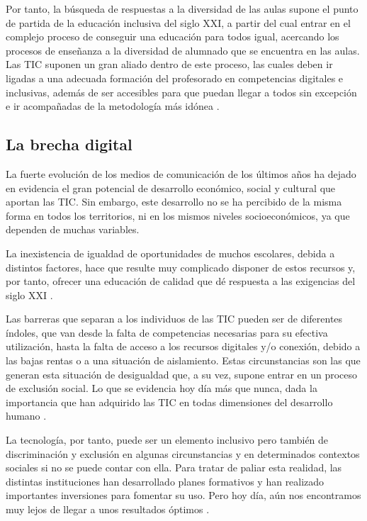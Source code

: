 \documentclass{textolivre}
\begin{document}
Por tanto, la búsqueda de respuestas a la diversidad de las aulas supone el punto de partida de la educación inclusiva del siglo XXI, a partir del cual entrar en el complejo proceso de conseguir una educación para todos igual, acercando los procesos de enseñanza a la diversidad de alumnado que se encuentra en las aulas. Las TIC suponen un gran aliado dentro de este proceso, las cuales deben ir ligadas a una adecuada formación del profesorado en competencias digitales e inclusivas, además de ser accesibles para que puedan llegar a todos sin excepción e ir acompañadas de la metodología más idónea \cite{marindiaz2020}.

\subsection{La brecha digital}
La fuerte evolución de los medios de comunicación de los últimos años ha dejado en evidencia el gran potencial de desarrollo económico, social y cultural que aportan las TIC. Sin embargo, este desarrollo no se ha percibido de la misma forma en todos los territorios, ni en los mismos niveles socioeconómicos, ya que dependen de muchas variables.

La inexistencia de igualdad de oportunidades de muchos escolares, debida a distintos factores, hace que resulte muy complicado disponer de estos recursos y, por tanto, ofrecer una educación de calidad que dé respuesta a las exigencias del siglo XXI \cite{moralesromo2017}.

Las barreras que separan a los individuos de las TIC pueden ser de diferentes índoles, que van desde la falta de competencias necesarias para su efectiva utilización, hasta la falta de acceso a los recursos digitales y/o conexión, debido a las bajas rentas o a una situación de aislamiento. Estas circunstancias son las que generan esta situación de desigualdad que, a su vez, supone entrar en un proceso de exclusión social. Lo que se evidencia hoy día más que nunca, dada la importancia que han adquirido las TIC en todas dimensiones del desarrollo humano \cite{martinezlopez2020}.

La tecnología, por tanto, puede ser un elemento inclusivo pero también de discriminación y exclusión en algunas circunstancias y en determinados contextos sociales si no se puede contar con ella. Para tratar de paliar esta realidad, las distintas instituciones han desarrollado planes formativos y han realizado importantes inversiones para fomentar su uso. Pero hoy día, aún nos encontramos muy lejos de llegar a unos resultados óptimos \cite{caberoalmenara2017}.
\end{document}
